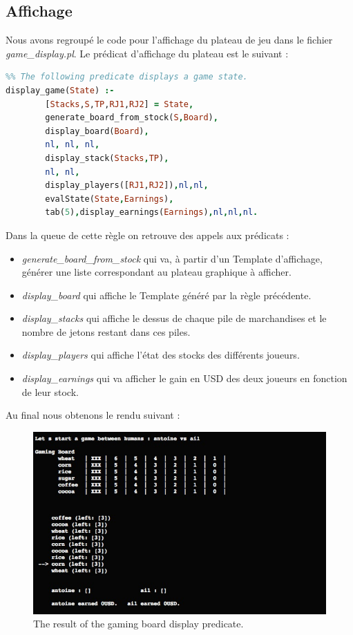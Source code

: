 \documentclass[a4paper, 11pt,twoside, leqno]{report}
\theoremstyle{plain}
\begin{document}
\subsection{Affichage}
Nous avons regroupé le code pour l'affichage du plateau de jeu dans le fichier \textit{game\_{}display.pl}. Le prédicat d'affichage du plateau est le suivant : 
\begin{lstlisting}[language=prolog]
%%%% display_game(+Game_State_To_Be_Displayed)
%% The following predicate displays a game state.
display_game(State) :-
		[Stacks,S,TP,RJ1,RJ2] = State,
		generate_board_from_stock(S,Board),
		display_board(Board),
		nl, nl, nl,
		display_stack(Stacks,TP),
		nl, nl,
		display_players([RJ1,RJ2]),nl,nl,
		evalState(State,Earnings),
		tab(5),display_earnings(Earnings),nl,nl,nl.
\end{lstlisting}

Dans la queue de cette règle on retrouve des appels aux prédicats :
\begin{itemize}
    \item \textit{generate\_{}board\_{}from\_{}stock} qui va, à partir d'un Template d'affichage, générer une liste correspondant au plateau graphique à afficher.  
    \item \textit{display\_{}board} qui affiche le Template généré par la règle précédente.
    \item \textit{display\_{}stacks} qui affiche le dessus de chaque pile de marchandises et le nombre de jetons restant dans ces piles.
    \item \textit{display\_{}players} qui affiche l'état des stocks des différents joueurs.
    \item \textit{display\_{}earnings} qui va afficher le gain en USD des deux joueurs en fonction de leur stock.
\end{itemize}
Au final nous obtenons le rendu suivant : 
\begin{figure}[H]
    \begin{center}
        \includegraphics[scale=0.5]{ScreenGamingBoard.jpg}
     \end{center}
     \caption{The result of the gaming board display predicate.}
     \label{fig:gamingboard}
 \end{figure}
     
\end{document}
